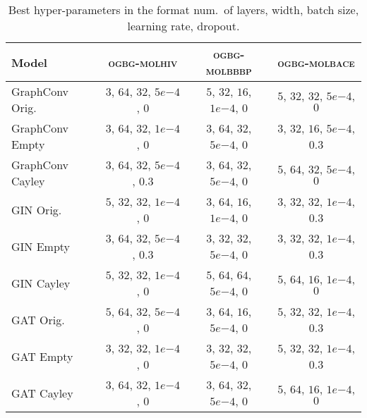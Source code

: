 \begin{table*}[h!]
\centering
\setlength{\tabcolsep}{0.7em}
\caption{Best hyper-parameters in the format num.\ of layers, width, batch size, learning rate, dropout.}
\label{tab:param_table_empty_cayley_orig_eval}
\begin{tabular}{lccc}
\toprule
\textbf{Model} & \textsc{ogbg-molhiv} & \textsc{ogbg-molbbbp} & \textsc{ogbg-molbace} \\
\midrule
GraphConv Orig. & $3$, $64$, $32$, $5e{-4}$, $0$ & $5$, $32$, $16$, $1e{-4}$, $0$ & $5$, $32$, $32$, $5e{-4}$, $0$ \\
GraphConv Empty & $3$, $64$, $32$, $1e{-4}$, $0$ & $3$, $64$, $32$, $5e{-4}$, $0$ & $3$, $32$, $16$, $5e{-4}$, 0.3 \\
GraphConv Cayley & $3$, $64$, $32$, $5e{-4}$, 0.3 & $3$, $64$, $32$, $5e{-4}$, $0$ & $5$, $64$, $32$, $5e{-4}$, $0$ \\
\midrule
GIN Orig. & $5$, $32$, $32$, $1e{-4}$, $0$ & $3$, $64$, $16$, $1e{-4}$, $0$ & $3$, $32$, $32$, $1e{-4}$, 0.3 \\
GIN Empty & $3$, $64$, $32$, $5e{-4}$, 0.3 & $3$, $32$, $32$, $5e{-4}$, $0$ & $3$, $32$, $32$, $1e{-4}$, 0.3 \\
GIN Cayley & $5$, $32$, $32$, $1e{-4}$, $0$ & $5$, $64$, $64$, $5e{-4}$, $0$ & $5$, $64$, $16$, $1e{-4}$, $0$ \\
\midrule
GAT Orig. & $5$, $64$, $32$, $5e{-4}$, $0$ & $3$, $64$, $16$, $5e{-4}$, $0$ & $5$, $32$, $32$, $1e{-4}$, 0.3 \\
GAT Empty & $3$, $32$, $32$, $1e{-4}$, $0$ & $3$, $32$, $32$, $5e{-4}$, $0$ & $5$, $32$, $32$, $1e{-4}$, 0.3 \\
GAT Cayley & $3$, $64$, $32$, $1e{-4}$, $0$ & $3$, $64$, $32$, $5e{-4}$, $0$ & $5$, $64$, $16$, $1e{-4}$, $0$ \\
\bottomrule
\end{tabular}
\end{table*}
